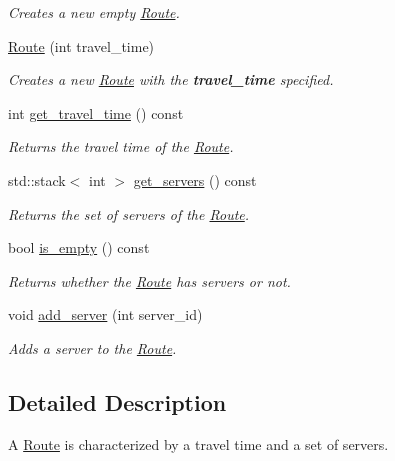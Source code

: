\begin{DoxyCompactItemize}
\begin{DoxyCompactList}\small\item\em Creates a new empty \hyperlink{class_route}{Route}. \end{DoxyCompactList}\item 
\hyperlink{class_route_a0d4195a212515192000cded1e6fc6fe1}{Route} (int travel\-\_\-time)
\begin{DoxyCompactList}\small\item\em Creates a new \hyperlink{class_route}{Route} with the {\bfseries travel\-\_\-time} specified. \end{DoxyCompactList}\item 
int \hyperlink{class_route_ab76f0d401c7492ca2e16e8b4402bd544}{get\-\_\-travel\-\_\-time} () const 
\begin{DoxyCompactList}\small\item\em Returns the travel time of the \hyperlink{class_route}{Route}. \end{DoxyCompactList}\item 
std\-::stack$<$ int $>$ \hyperlink{class_route_adc747b5532d9e0150637e56f7f79c271}{get\-\_\-servers} () const 
\begin{DoxyCompactList}\small\item\em Returns the set of servers of the \hyperlink{class_route}{Route}. \end{DoxyCompactList}\item 
bool \hyperlink{class_route_ae50842073a24659f7b60885e2e9c8ff6}{is\-\_\-empty} () const 
\begin{DoxyCompactList}\small\item\em Returns whether the \hyperlink{class_route}{Route} has servers or not. \end{DoxyCompactList}\item 
void \hyperlink{class_route_a83ac0bdc29132d404c5fb00ab8729b4f}{add\-\_\-server} (int server\-\_\-id)
\begin{DoxyCompactList}\small\item\em Adds a server to the \hyperlink{class_route}{Route}. \end{DoxyCompactList}\end{DoxyCompactItemize}


\subsection{Detailed Description}
A \hyperlink{class_route}{Route} is characterized by a travel time and a set of servers. 

